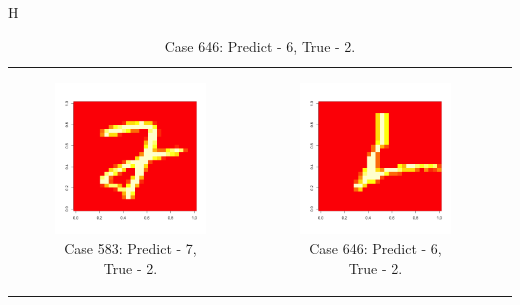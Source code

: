 \documentclass[10pt]{extarticle}
\begin{document}
\begin{table}{H}
\begin{tabular}{c c c}
\begin{subfigure}{0.3\textwidth}\centering\includegraphics[scale = .25]{../Images/583.png}\caption{Case 583: Predict - 7, True - 2.}\label{fig:taba}\end{subfigure}&
\newline
\begin{subfigure}{0.3\textwidth}\centering\includegraphics[scale = .25]{../Images/646.png}\caption{Case 646: Predict - 6, True - 2.}\label{fig:taba}\end{subfigure}&

\end{tabular}
\end{table}
\end{document}

